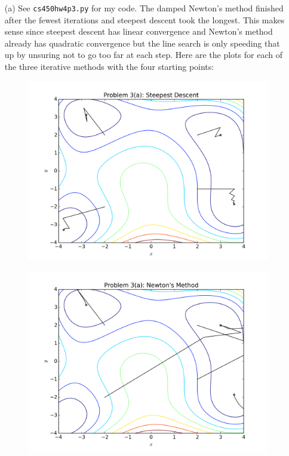 \documentclass[10pt]{article}
\begin{document}
\begin{itemize}
\item[(a)] See \verb+cs450hw4p3.py+ for my code. The damped Newton's method finished after the fewest iterations and steepest descent took the longest. This makes sense since steepest descent has linear convergence and Newton's method already has quadratic convergence but the line search is only speeding that up by unsuring not to go too far at each step. Here are the plots for each of the three iterative methods with the four starting points:

\begin{figure}[H]
  \centering
    \includegraphics[scale=0.9]{p3afig1}
\end{figure}

\begin{figure}[H]
  \centering
    \includegraphics[scale=0.9]{p3afig2}
\end{figure}


\end{itemize}
\end{document}
